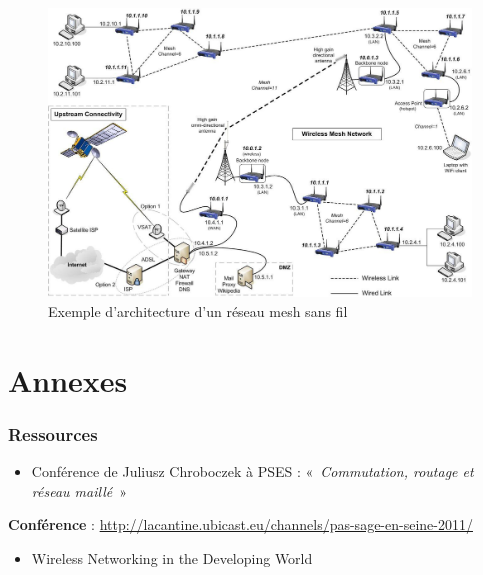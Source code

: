 \documentclass[a4paper,french,11pt,twoside]{article}
\begin{document}
\begin{figure}[!h]
\center
\includegraphics[scale=0.40, angle=90]{figure6.jpeg}
\caption{Exemple d'architecture d'un réseau mesh sans fil} %
\label{figure6}
\end{figure}

\clearpage
\newpage
\appendix
\part{Annexes}



\section{Ressources}

\begin{itemize}
\renewcommand{\labelitemi}{$\bullet$}
    \item{Conférence de Juliusz Chroboczek à PSES : «~\textit{Commutation, routage et réseau maillé}~»}
\end{itemize}
\noindent \textbf{Conférence} : \url{http://lacantine.ubicast.eu/channels/pas-sage-en-seine-2011/}

\medskip
\begin{itemize}
\renewcommand{\labelitemi}{$\bullet$}
    \item{Wireless Networking in the Developing World}
\end{itemize}
\end{document}
